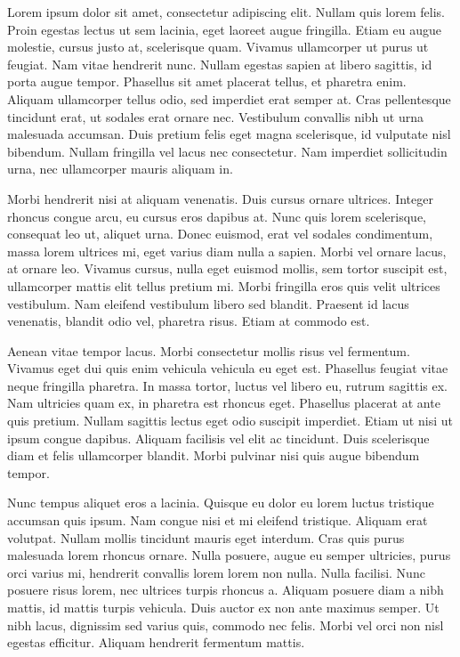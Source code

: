 \documentclass[../main.tex]{subfiles}
\begin{document}
Lorem ipsum dolor sit amet, consectetur adipiscing elit. Nullam quis lorem felis. Proin egestas lectus ut sem lacinia, eget laoreet augue fringilla. Etiam eu augue molestie, cursus justo at, scelerisque quam. Vivamus ullamcorper ut purus ut feugiat. Nam vitae hendrerit nunc. Nullam egestas sapien at libero sagittis, id porta augue tempor. Phasellus sit amet placerat tellus, et pharetra enim. Aliquam ullamcorper tellus odio, sed imperdiet erat semper at. Cras pellentesque tincidunt erat, ut sodales erat ornare nec. Vestibulum convallis nibh ut urna malesuada accumsan. Duis pretium felis eget magna scelerisque, id vulputate nisl bibendum. Nullam fringilla vel lacus nec consectetur. Nam imperdiet sollicitudin urna, nec ullamcorper mauris aliquam in.

Morbi hendrerit nisi at aliquam venenatis. Duis cursus ornare ultrices. Integer rhoncus congue arcu, eu cursus eros dapibus at. Nunc quis lorem scelerisque, consequat leo ut, aliquet urna. Donec euismod, erat vel sodales condimentum, massa lorem ultrices mi, eget varius diam nulla a sapien. Morbi vel ornare lacus, at ornare leo. Vivamus cursus, nulla eget euismod mollis, sem tortor suscipit est, ullamcorper mattis elit tellus pretium mi. Morbi fringilla eros quis velit ultrices vestibulum. Nam eleifend vestibulum libero sed blandit. Praesent id lacus venenatis, blandit odio vel, pharetra risus. Etiam at commodo est.

Aenean vitae tempor lacus. Morbi consectetur mollis risus vel fermentum. Vivamus eget dui quis enim vehicula vehicula eu eget est. Phasellus feugiat vitae neque fringilla pharetra. In massa tortor, luctus vel libero eu, rutrum sagittis ex. Nam ultricies quam ex, in pharetra est rhoncus eget. Phasellus placerat at ante quis pretium. Nullam sagittis lectus eget odio suscipit imperdiet. Etiam ut nisi ut ipsum congue dapibus. Aliquam facilisis vel elit ac tincidunt. Duis scelerisque diam et felis ullamcorper blandit. Morbi pulvinar nisi quis augue bibendum tempor.

Nunc tempus aliquet eros a lacinia. Quisque eu dolor eu lorem luctus tristique accumsan quis ipsum. Nam congue nisi et mi eleifend tristique. Aliquam erat volutpat. Nullam mollis tincidunt mauris eget interdum. Cras quis purus malesuada lorem rhoncus ornare. Nulla posuere, augue eu semper ultricies, purus orci varius mi, hendrerit convallis lorem lorem non nulla. Nulla facilisi. Nunc posuere risus lorem, nec ultrices turpis rhoncus a. Aliquam posuere diam a nibh mattis, id mattis turpis vehicula. Duis auctor ex non ante maximus semper. Ut nibh lacus, dignissim sed varius quis, commodo nec felis. Morbi vel orci non nisl egestas efficitur. Aliquam hendrerit fermentum mattis.
\end{document}
